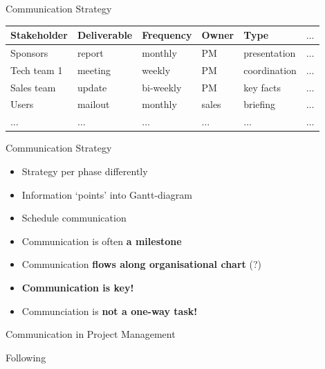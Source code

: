 \begin{frame}{Communication Strategy}
    \begin{tabular}{llllll}
        \toprule
         Stakeholder & Deliverable & Frequency & Owner & Type & $\dots$ \\
         \midrule
         Sponsors       & report & monthly & PM & presentation & $\dots$ \\
         Tech team 1    & meeting & weekly & PM & coordination & $\dots$ \\
         Sales team     & update & bi-weekly & PM & key facts & $\dots$ \\
         Users    & mailout & monthly & sales & briefing & $\dots$ \\
         $\dots$ & $\dots$ & $\dots$ & $\dots$ & $\dots$ &  $\dots$ \\
         \bottomrule
    \end{tabular}
\end{frame}

\begin{frame}{Communication Strategy}        
    \begin{itemize}
        \item Strategy per phase differently
        \item Information `points' into Gantt-diagram
        \item Schedule communication
        \item Communication is often \textbf{a milestone}
        \item Communication \textbf{flows along organisational chart} (?)
        \item \textbf{Communication is key!}
        \item Communciation is \textbf{not a one-way task!}
    \end{itemize}
    
\end{frame}




\begin{frame}{Communication in Project Management}
    \par
    Following \cite[p.~205]{KerznerHarold2017Pm:a}
\end{frame}


\renewcommand{\mybox}[1]{\fbox{
    \begin{minipage}[t][10ex][t]{2cm}
        \centering #1
    \end{minipage}
}}
        
